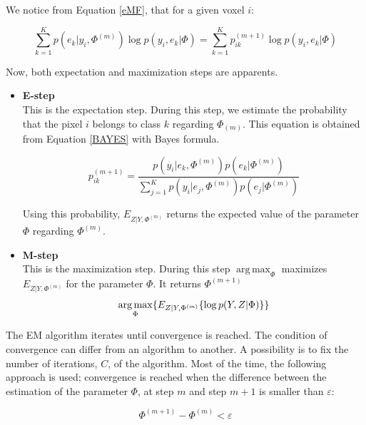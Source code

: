 We notice from Equation \ref{eMF}, that for a given voxel $i$:

  \begin{equation}\label{BAYES}
  \sum_{k=1}^K   p(e_{k}|y_i,\Phi^{(m)})\operatorname*{log} p(y_i,e_{k}|\Phi) = \sum_{k=1}^K   p_{ik}^{(m+1)}\operatorname*{log} p(y_i,e_{k}|\Phi)
  \end{equation}

Now, both expectation and maximization steps are apparents.\\
\begin{itemize}
\item \textbf{E-step}\\
This is the expectation step. During this step, we estimate the probability that the pixel $i$ belongs to class $k$ regarding $\Phi_{(m)}$. This equation is obtained from Equation \ref{BAYES} with Bayes formula.

  \begin{equation}\label{ESTEP1}
  p_{ik}^{(m+1)} = \frac{p(y_i|e_k,\Phi^{(m)})p(e_k|\Phi^{(m)})}{\sum_{j=1}^K   p(y_i|e_j,\Phi^{(m)}) p(e_{j}|\Phi^{(m)})}  
  \end{equation}

Using this probability, $E_{Z|Y,\Phi^{(m)}}$ returns the expected value of the parameter $\Phi$ regarding $\Phi^{(m)}$.\\


\item \textbf{M-step}\\
This is the maximization step. During this step $\operatorname*{arg\,max}_\Phi$ maximizes $E_{Z|Y,\Phi^{(m)}}$ for the parameter $\Phi$. It returns $\Phi^{(m+1)}$
  \begin{equation}
  \operatorname*{arg\,max}_\Phi \{ E_{Z|Y,\Phi^{(m)}} \{\operatorname*{log} p(Y,Z|\Phi)\}\}\\
  \end{equation}
 
\end{itemize} 
  
The EM algorithm iterates until convergence is reached. The condition of convergence can differ from an algorithm to another. A possibility is to fix the number of iterations, $C$, of the algorithm. Most of the time, the following approach is used; convergence is reached when the difference between the estimation of the parameter $\Phi$, at step $m$ and step $m+1$ is smaller than $\varepsilon$:

  \begin{equation*}
  \Phi^{(m+1)}-\Phi^{(m)} < \varepsilon
  \end{equation*}

